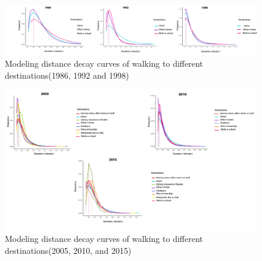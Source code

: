 \documentclass[
11pt, %
oneside, %
english, %
singlespacing, %
]{macthesis} %
\begin{document}
\newpage
\thispagestyle{empty}
\begin{landscape}

\begin{figure}

{\centering \includegraphics[width=1\linewidth]{figure/ch03-Fig17} 

}

\caption{Modeling distance decay curves of walking to different destinations(1986, 1992 and 1998)}\label{fig:imp-w1}
\end{figure}

\begin{figure}

{\centering \includegraphics[width=0.9\linewidth]{figure/ch03-Fig18} 

}

\caption{Modeling distance decay curves of walking to different destinations(2005, 2010, and 2015)}\label{fig:imp-w2}
\end{figure}

\end{landscape}
\clearpage
\end{document}
